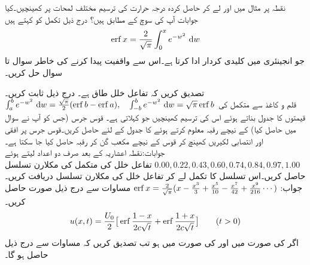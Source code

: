 \quad
نقطہ  پر مثال  میں  اور  لے کر حاصل کردہ درجہ حرارت  کی ترسیم مختلف لمحات پر  کھینچیں۔کیا جوابات آپ کی سوچ کے مطابق ہیں؟
 درج ذیل تکمل کو کہتے ہیں
\begin{align*}
\erf x =\frac{2}{\sqrt{\pi}}\int_0^x e^{-w^2}\,\dif w
\end{align*} 
جو انجینئری میں کلیدی کردار ادا کرتا ہے۔اس سے واقفیت  پیدا کرنے کی خاطر سوال  تا سوال  حل کریں۔

\quad 
تصدیق کریں کہ تفاعل خلل طاق ہے۔
\quad درج ذیل ثابت کریں۔\\
 $\int_a^be^{-w^2}\,\dif w=\frac{\sqrt{\pi}}{2}(\erf b-\erf a),\quad \int_{-b}^be^{-w^2}\,\dif w=\sqrt{\pi}\erf b$
\quad
قلم و کاغذ سے متکمل  کی قیمتوں کا جدول بناتے ہوئے اس کی ترسیم کھینچیں جو  کہلاتی ہے۔  
\quad
قوس جرس (جس کو آپ نے سوال  میں حاصل کیا) کے نیچے رقبہ معلوم کرتے ہوئے  کا جدول  کے لئے حاصل کریں۔قوس جرس پر افقی اور انتصابی لکیریں کھینچ کر قوس کے نیچے مکعب گن کر رقبہ حاصل کیا جا سکتا ہے۔\\
جوابات:\quad نقطہ اعشاریہ کے بعد صرف دو اعداد لیتے ہوئے \quad
$0.00, 0.22, 0.43, 0.60, 0.74, 0.84,0.97,1.00$
\quad تفاعل خلل کی متکمل  کی مکلارن تسلسل حاصل کریں۔اس تسلسل کا تکمل لے کر تفاعل خلل  کی مکلارن تسلسل دریافت کریں۔\\
جواب:\quad
$\operatorname{erf} x=\tfrac{2}{\sqrt{\pi}}(x-\tfrac{x^3}{3}+\tfrac{x^5}{10}-\tfrac{x^7}{42}+\tfrac{x^9}{216}\cdots)$
\quad 
مساوات  سے درج ذیل صورت  حاصل کریں۔
\begin{align*}
u(x,t)=\frac{U_0}{2}\big[\operatorname{erf} \frac{1-x}{2c\sqrt{t}}+\operatorname{erf} \frac{1+x}{2c\sqrt{t}}\big]\quad \quad (t>0)
\end{align*}
\quad اگر  کی صورت میں  اور  کی صورت میں  ہو تب تصدیق کریں کہ مساوات  سے درج ذیل حاصل ہو گا۔
